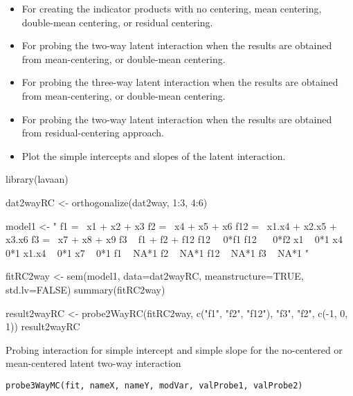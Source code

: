 \documentclass[a4paper]{book}
\begin{document}
\begin{SeeAlso}\relax
\begin{itemize}

\item {} For creating the indicator products with no centering, mean centering, double-mean centering, or residual centering.
\item {} For probing the two-way latent interaction when the results are obtained from mean-centering, or double-mean centering.
\item {} For probing the three-way latent interaction when the results are obtained from mean-centering, or double-mean centering.
\item {} For probing the two-way latent interaction when the results are obtained from residual-centering approach.
\item {} Plot the simple intercepts and slopes of the latent interaction.

\end{itemize}

\end{SeeAlso}
%
\begin{Examples}
\begin{ExampleCode}
library(lavaan) 

dat2wayRC <- orthogonalize(dat2way, 1:3, 4:6)

model1 <- "
f1 =~ x1 + x2 + x3
f2 =~ x4 + x5 + x6
f12 =~ x1.x4 + x2.x5 + x3.x6
f3 =~ x7 + x8 + x9
f3 ~ f1 + f2 + f12
f12 ~~0*f1
f12 ~~ 0*f2
x1 ~ 0*1
x4 ~ 0*1
x1.x4 ~ 0*1
x7 ~ 0*1
f1 ~ NA*1
f2 ~ NA*1
f12 ~ NA*1
f3 ~ NA*1
"

fitRC2way <- sem(model1, data=dat2wayRC, meanstructure=TRUE, std.lv=FALSE)
summary(fitRC2way)

result2wayRC <- probe2WayRC(fitRC2way, c("f1", "f2", "f12"), "f3", "f2", c(-1, 0, 1))
result2wayRC
\end{ExampleCode}
\end{Examples}
%
\begin{Description}\relax
Probing interaction for simple intercept and simple slope for the no-centered or mean-centered latent two-way interaction
\end{Description}
%
\begin{Usage}
\begin{verbatim}
probe3WayMC(fit, nameX, nameY, modVar, valProbe1, valProbe2)
\end{verbatim}
\end{Usage}
\end{document}
